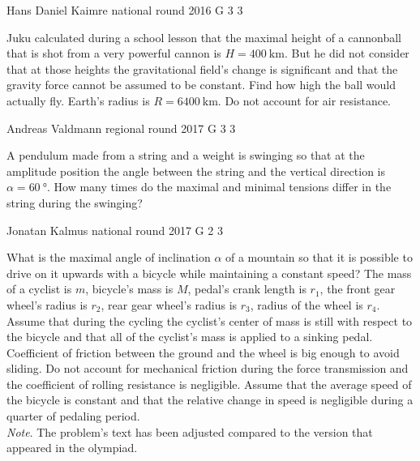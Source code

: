 \documentclass[11pt]{article}
\begin{document}
{Hans Daniel Kaimre} %
{national round} %
{2016} %
{G 3} %
{3} %
{

\ifEngStatement
Juku calculated during a school lesson that the maximal height of a cannonball that is shot from a very powerful cannon is $H=\SI{400}{\km}$. But he did not consider that at those heights the gravitational field’s change is significant and that the gravity force cannot be assumed to be constant. Find how high the ball would actually fly. Earth’s radius is $R=\SI{6400}{\km}$. Do not account for air resistance.
\fi
}

{Andreas Valdmann} %
{regional round} %
{2017} %
{G 3} %
{3} %
{

\ifEngStatement
A pendulum made from a string and a weight is swinging so that at the amplitude position the angle between the string and the vertical direction is $\alpha=\SI{60}{\degree}$. How many times do the maximal and minimal tensions differ in the string during the swinging?
\fi
}

{Jonatan Kalmus} %
{national round} %
{2017} %
{G 2} %
{3} %
{

\ifEngStatement
What is the maximal angle of inclination $\alpha$ of a mountain so that it is possible to drive on it upwards with a bicycle while maintaining a constant speed? The mass of a cyclist is $m$, bicycle’s mass is $M$, pedal’s crank length is $r_1$, the front gear wheel’s radius is $r_2$, rear gear wheel’s radius is $r_3$, radius of the wheel is $r_4$. Assume that during the cycling the cyclist’s center of mass is still with respect to the bicycle and that all of the cyclist’s mass is applied to a sinking pedal. Coefficient of friction between the ground and the wheel is big enough to avoid sliding. Do not account for mechanical friction during the force transmission and the coefficient of rolling resistance is negligible. Assume that the average speed of the bicycle is constant and that the relative change in speed is negligible during a quarter of pedaling period.\\
\emph{Note}. The problem’s text has been adjusted compared to the version that appeared in the olympiad.
\fi
}
\end{document}
